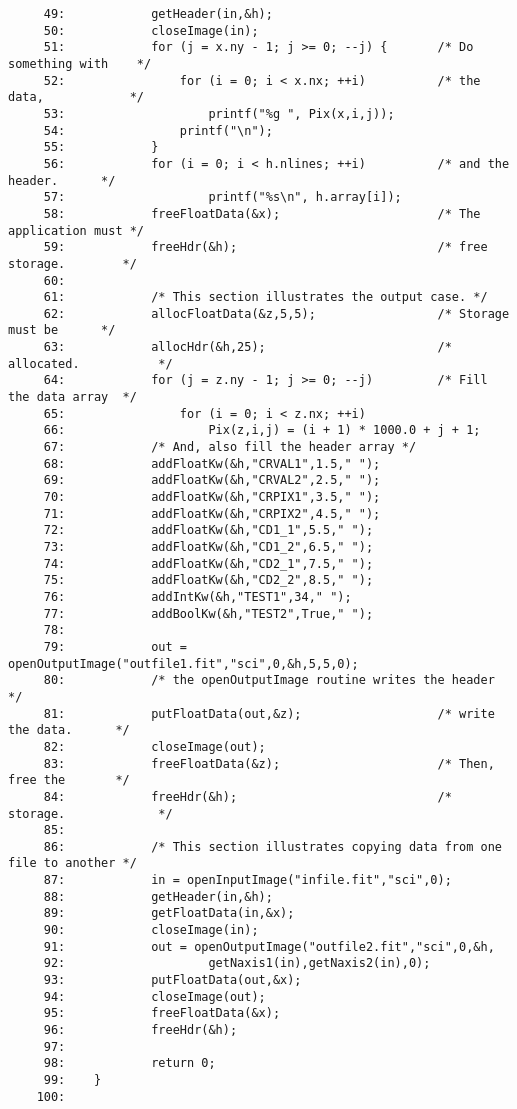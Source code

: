 \begin{scriptsize}
\begin{verbatim}
     49:            getHeader(in,&h);
     50:            closeImage(in);
     51:            for (j = x.ny - 1; j >= 0; --j) {       /* Do something with    */
     52:                for (i = 0; i < x.nx; ++i)          /* the data,            */
     53:                    printf("%g ", Pix(x,i,j));
     54:                printf("\n");
     55:            }
     56:            for (i = 0; i < h.nlines; ++i)          /* and the header.      */
     57:                    printf("%s\n", h.array[i]);
     58:            freeFloatData(&x);                      /* The application must */
     59:            freeHdr(&h);                            /* free storage.        */
     60:    
     61:            /* This section illustrates the output case. */
     62:            allocFloatData(&z,5,5);                 /* Storage must be      */
     63:            allocHdr(&h,25);                        /* allocated.           */
     64:            for (j = z.ny - 1; j >= 0; --j)         /* Fill the data array  */
     65:                for (i = 0; i < z.nx; ++i)          
     66:                    Pix(z,i,j) = (i + 1) * 1000.0 + j + 1;
     67:            /* And, also fill the header array */
     68:            addFloatKw(&h,"CRVAL1",1.5," "); 
     69:            addFloatKw(&h,"CRVAL2",2.5," "); 
     70:            addFloatKw(&h,"CRPIX1",3.5," "); 
     71:            addFloatKw(&h,"CRPIX2",4.5," "); 
     72:            addFloatKw(&h,"CD1_1",5.5," "); 
     73:            addFloatKw(&h,"CD1_2",6.5," "); 
     74:            addFloatKw(&h,"CD2_1",7.5," "); 
     75:            addFloatKw(&h,"CD2_2",8.5," "); 
     76:            addIntKw(&h,"TEST1",34," "); 
     77:            addBoolKw(&h,"TEST2",True," "); 
     78:    
     79:            out = openOutputImage("outfile1.fit","sci",0,&h,5,5,0);
     80:            /* the openOutputImage routine writes the header */
     81:            putFloatData(out,&z);                   /* write the data.      */
     82:            closeImage(out);
     83:            freeFloatData(&z);                      /* Then, free the       */
     84:            freeHdr(&h);                            /* storage.             */
     85:    
     86:            /* This section illustrates copying data from one file to another */
     87:            in = openInputImage("infile.fit","sci",0);
     88:            getHeader(in,&h);
     89:            getFloatData(in,&x);
     90:            closeImage(in);
     91:            out = openOutputImage("outfile2.fit","sci",0,&h,
     92:                    getNaxis1(in),getNaxis2(in),0);
     93:            putFloatData(out,&x);
     94:            closeImage(out);
     95:            freeFloatData(&x);
     96:            freeHdr(&h);
     97:    
     98:            return 0;
     99:    }
    100:    
\end{verbatim}
\end{scriptsize}


